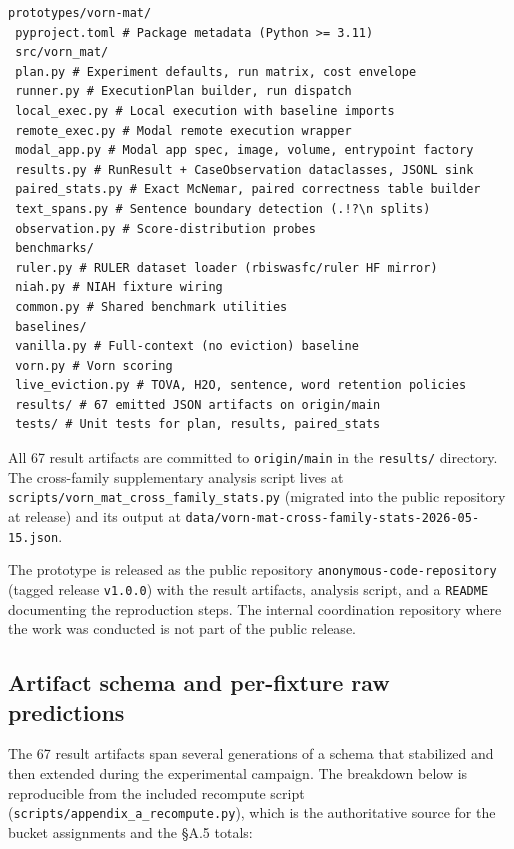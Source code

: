 \documentclass[10pt]{article}
\begin{document}
\begin{verbatim}
prototypes/vorn-mat/
 pyproject.toml # Package metadata (Python >= 3.11)
 src/vorn_mat/
 plan.py # Experiment defaults, run matrix, cost envelope
 runner.py # ExecutionPlan builder, run dispatch
 local_exec.py # Local execution with baseline imports
 remote_exec.py # Modal remote execution wrapper
 modal_app.py # Modal app spec, image, volume, entrypoint factory
 results.py # RunResult + CaseObservation dataclasses, JSONL sink
 paired_stats.py # Exact McNemar, paired correctness table builder
 text_spans.py # Sentence boundary detection (.!?\n splits)
 observation.py # Score-distribution probes
 benchmarks/
 ruler.py # RULER dataset loader (rbiswasfc/ruler HF mirror)
 niah.py # NIAH fixture wiring
 common.py # Shared benchmark utilities
 baselines/
 vanilla.py # Full-context (no eviction) baseline
 vorn.py # Vorn scoring
 live_eviction.py # TOVA, H2O, sentence, word retention policies
 results/ # 67 emitted JSON artifacts on origin/main
 tests/ # Unit tests for plan, results, paired_stats
\end{verbatim}

All 67 result artifacts are committed to \texttt{origin/main} in the
\texttt{results/} directory. The cross-family supplementary analysis
script lives at \texttt{scripts/\allowbreak{}vorn\_mat\_cross\_family\_stats.\allowbreak{}py}
(migrated into the public repository at release) and its output at
\texttt{data/\allowbreak{}vorn-mat-cross-family-stats-2026-05-15.\allowbreak{}json}.

The prototype is released as the public repository
\texttt{anonymous-code-repository} (tagged release \texttt{v1.0.0}) with the
result artifacts, analysis script, and a \texttt{README} documenting the
reproduction steps. The internal coordination repository where
the work was conducted is not part of the public release.

\subsection{Artifact schema and per-fixture raw predictions}\label{a2-artifact-schema-and-per-fixture-raw-predictions}

The 67 result artifacts span several generations of a schema that
stabilized and then extended during the experimental campaign. The
breakdown below is reproducible from the included recompute script
(\texttt{scripts/\allowbreak{}appendix\_a\_recompute.\allowbreak{}py}), which is the authoritative
source for the bucket assignments and the \S{}A.5 totals:
\end{document}
